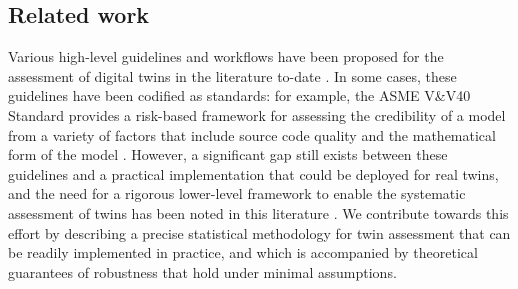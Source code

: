 


\subsection{Related work}

Various high-level guidelines and workflows have been proposed for the assessment of digital twins in the literature to-date \citep{roy2011comprehensive,grieves2017digital,khan2018digital,corral2020digital,kochunas2021digital,niederer2021scaling,dahmen2022verification}. %
In some cases, these guidelines have been codified as standards: for example, the ASME V\&V40 Standard \citep{amse2018assessing} provides a risk-based framework for assessing the credibility of a model from a variety of factors that include source code quality and the mathematical form of the model \citep{galappaththige2022credibility}.
However, a significant gap still exists between these guidelines and a practical implementation that could be deployed for real twins, and the need for a rigorous lower-level framework to enable the systematic assessment of twins has been noted in this literature \citep{corral2020digital,niederer2021scaling,kapteyn2021probabilistic,masison2021modular}.
We contribute towards this effort by describing a precise statistical methodology for twin assessment that can be readily implemented in practice, and which is accompanied by theoretical guarantees of robustness that hold under minimal assumptions.


